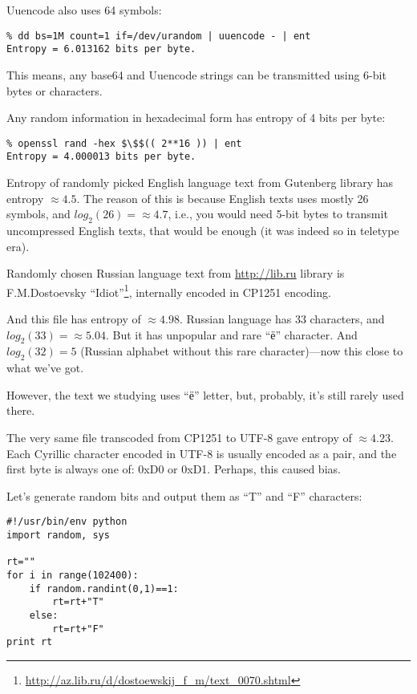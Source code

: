Uuencode also uses 64 symbols:

\begin{lstlisting}
% dd bs=1M count=1 if=/dev/urandom | uuencode - | ent
Entropy = 6.013162 bits per byte.
\end{lstlisting}

This means, any base64 and Uuencode strings can be transmitted using 6-bit bytes or characters.

Any random information in hexadecimal form has entropy of 4 bits per byte:

\begin{lstlisting}
% openssl rand -hex $\$$(( 2**16 )) | ent
Entropy = 4.000013 bits per byte.
\end{lstlisting}

Entropy of randomly picked English language text from Gutenberg library has entropy $\approx 4.5$.
The reason of this is because English texts uses mostly 26 symbols, and $log_2(26)=\approx 4.7$, i.e., you would need
5-bit bytes to transmit uncompressed English texts, that would be enough (it was indeed so in teletype era).

Randomly chosen Russian language text from \url{http://lib.ru}
library is F.M.Dostoevsky ``Idiot''\footnote{\url{http://az.lib.ru/d/dostoewskij_f_m/text_0070.shtml}},
internally encoded in CP1251 encoding.

And this file has entropy of $\approx 4.98$.
Russian language has 33 characters, and $log_2(33)=\approx 5.04$.
But it has unpopular and rare ``ё'' character.
And $log_2(32)=5$ (Russian alphabet without this rare character)---now this close to what we've got.

However, the text we studying uses ``ё'' letter, but, probably, it's still rarely used there.

The very same file transcoded from CP1251 to UTF-8 gave entropy of $\approx 4.23$.
Each Cyrillic character encoded in UTF-8 is usually encoded as a pair,
and the first byte is always one of: 0xD0 or 0xD1.
Perhaps, this caused bias.

Let's generate random bits and output them as ``T'' and ``F'' characters:

\begin{lstlisting}[style=custompy]
#!/usr/bin/env python
import random, sys

rt=""
for i in range(102400):
    if random.randint(0,1)==1:
        rt=rt+"T"
    else:
        rt=rt+"F"
print rt
\end{lstlisting}

